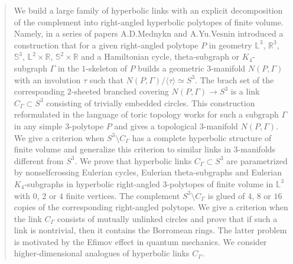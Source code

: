 \documentclass[12pt]{amsart}
\theoremstyle{definition}
\theoremstyle{remark}
\begin{document}



\begin{abstract}
We build a large family of hyperbolic links with an explicit 
decomposition of the complement into right-angled hyperbolic polytopes of finite volume.
Namely, in a series of papers A.D.Mednykn and A.Yu.Vesnin introduced a construction 
that for a given right-angled polytope $P$ in geometry $\mathbb L^3$, $\mathbb R^3$, $\mathbb S^3$,
$\mathbb L^2\times \mathbb R$, $\mathbb S^2\times \mathbb R$ and a Hamiltonian
cycle, theta-subgraph or $K_4$-subgraph $\Gamma$ in the $1$-skeleton of $P$ builds a geometric
$3$-manifold $N(P,\Gamma)$ with an involution $\tau$ such that $N(P,\Gamma)/\langle\tau\rangle\simeq S^3$.
The brach set of the corresponding $2$-sheeted branched covering $N(P,\Gamma)\to S^3$ is a link $C_\Gamma\subset S^3$
consisting of trivially embedded circles. This construction reformulated in the language of
toric topology works for such a subgraph $\Gamma$ in any simple $3$-polytope $P$ and gives a
topological $3$-manifold $N(P,\Gamma)$. We give a criterion when $S^3\setminus C_\Gamma$ 
has a complete hyperbolic structure of finite volume and generalize this criterion to
similar links in $3$-manifolds different from $S^3$. We prove that hyperbolic links $C_\Gamma\subset S^3$
are parametrized by nonselfcrossing Eulerian cycles, Eulerian theta-subgraphs and Eulerian $K_4$-subgraphs 
in hyperbolic right-angled $3$-polytopes of finite volume in $\mathbb L^3$ with $0$, $2$ or $4$ finite vertices.
The complement $S^3\setminus C_\Gamma$ is glued of $4$, $8$ or $16$ copies of the corresponding right-angled polytope.
We give a criterion when the link $C_\Gamma$ consists of mutually unlinked circles and 
prove that if such a link is nontrivial, then it contains the Borromean rings. The latter problem is
motivated by the Efimov effect in  quantum mechanics. We consider higher-dimensional analogues of
hyperbolic links $C_\Gamma$.
\end{abstract}
\maketitle
\tableofcontents
\setcounter{section}{0}
\end{document}
